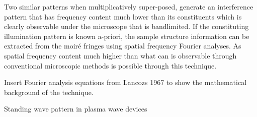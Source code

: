 \documentclass[11pt]{article}
\renewcommand{\^}{\hat}  %
\begin{document}
Two similar patterns when multiplicatively super-posed, generate an interference pattern that has frequency content much lower than its constituents which is clearly observable under the microscope that is bandlimited. If the constituting illumination pattern is known a-priori, the sample structure information can be extracted from the moiré fringes using spatial frequency Fourier analyses. As spatial frequency content much higher than what can is observable through conventional microscopic methods is possible through this technique.

Insert Fourier analysis equations from Lancozs 1967 to show the mathematical background of the technique.

Standing wave pattern in plasma wave  devices
\end{document}

